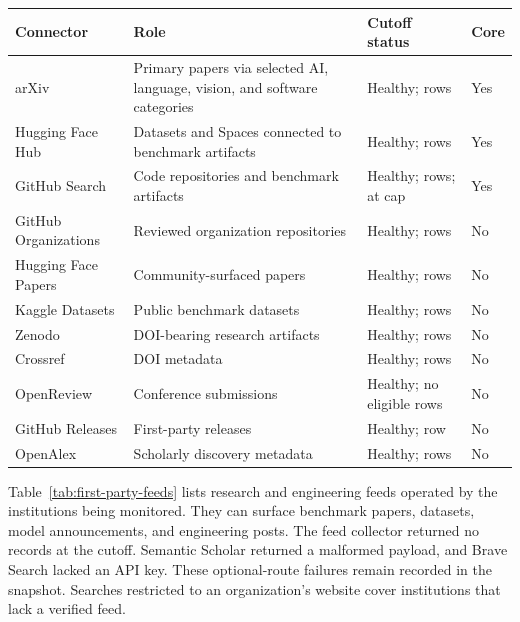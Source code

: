 \documentclass[11pt]{article}
\begin{document}
\begin{center}
\centering
\small
\begin{tabularx}{\textwidth}{L{0.21\textwidth}Y L{0.21\textwidth}L{0.08\textwidth}}
\toprule
\textbf{Connector} & \textbf{Role} & \textbf{Cutoff status} & \textbf{Core}\\
\midrule
arXiv & Primary papers via selected AI, language, vision, and software categories & Healthy; \FindingsConnectorArxiv{} rows & Yes\\
Hugging Face Hub & Datasets and Spaces connected to benchmark artifacts & Healthy; \FindingsConnectorHuggingface{} rows & Yes\\
GitHub Search & Code repositories and benchmark artifacts & Healthy; \FindingsConnectorGithub{} rows; at cap & Yes\\
GitHub Organizations & Reviewed organization repositories & Healthy; \FindingsConnectorGithubOrganizations{} rows & No\\
Hugging Face Papers & Community-surfaced papers & Healthy; \FindingsConnectorHuggingfacePapers{} rows & No\\
Kaggle Datasets & Public benchmark datasets & Healthy; \FindingsConnectorKaggleDatasets{} rows & No\\
Zenodo & DOI-bearing research artifacts & Healthy; \FindingsConnectorZenodo{} rows & No\\
Crossref & DOI metadata & Healthy; \FindingsConnectorCrossref{} rows & No\\
OpenReview & Conference submissions & Healthy; no eligible rows & No\\
GitHub Releases & First-party releases & Healthy; \FindingsConnectorGithubReleases{} row & No\\
OpenAlex & Scholarly discovery metadata & Healthy; \FindingsConnectorOpenalex{} rows & No\\
\bottomrule
\end{tabularx}
\label{tab:healthy-connectors}
\end{center}

Table~\ref{tab:first-party-feeds} lists research and engineering feeds operated by the institutions being monitored. They can surface benchmark papers, datasets, model announcements, and engineering posts. The feed collector returned no records at the cutoff. Semantic Scholar returned a malformed payload, and Brave Search lacked an API key. These optional-route failures remain recorded in the snapshot. Searches restricted to an organization's website cover institutions that lack a verified feed.
\end{document}
